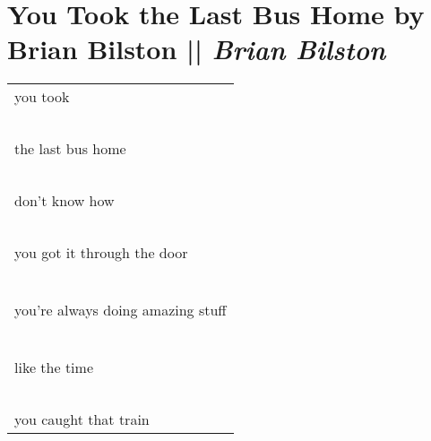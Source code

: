 \section[You Took the Last Bus Home by Brian Bilston]{You Took the Last Bus Home by Brian Bilston || \emph{Brian Bilston} \hspace*{\fill}  \thepage}
\hspace{0pt}
\vfill
\begin{center}
\begin{tabular}{l}
you took\\
\-\ \\the last bus home\\
\-\ \\don’t know how\\
\-\ \\you got it through the door\\
\-\ \\ \\you’re always doing amazing stuff\\
\-\ \\ \\like the time\\
\-\ \\you caught that train
\end{tabular}
\end{center}
\vfill
\hspace{0pt}